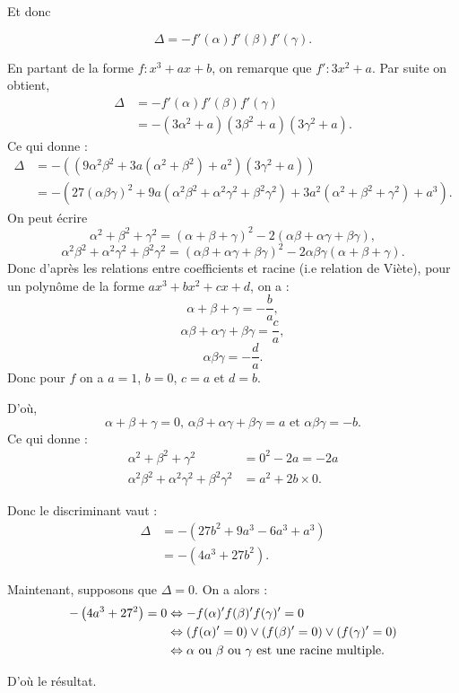 \begin{demonstration}
Et donc 

\[
\Delta = - f'(\alpha) f'(\beta ) f'(\gamma)
.\] 

En partant de la forme $f : x^3 + ax + b$, on remarque que $f' : 3x^2 + a$. Par suite on obtient,
\begin{align*}
    \Delta &= - f'(\alpha) f'(\beta ) f'(\gamma) \\
      &= - \left( 3 \alpha^2 + a \right) \left( 3 \beta^2 + a \right) \left( 3 \gamma^2 + a \right) 
.\end{align*}
Ce qui donne :
\begin{align*}
    \Delta  &= - \left( ( 9 \alpha^2 \beta^2 + 3a ( \alpha^2 + \beta^2 ) + a^2 ) ( 3 \gamma^2 + a ) \right)  \\
       &= - \left( 27 \left( \alpha \beta \gamma \right)^2  + 9a \left( \alpha^2 \beta^2 + \alpha^2 \gamma^2 + \beta^2 \gamma^2 \right) + 3a^2 \left( \alpha^2 + \beta^2 + \gamma^2 \right) + a^3 \right) 
.\end{align*}
On peut écrire
\[
\alpha^2 + \beta^2 + \gamma^2 = \left( \alpha + \beta + \gamma \right)^2 - 2 \left( \alpha \beta + \alpha \gamma + \beta \gamma \right)
,\] 
\[
\alpha^2 \beta^2 + \alpha^2 \gamma^2 + \beta^2 \gamma^2 = \left( \alpha \beta + \alpha \gamma + \beta \gamma \right)^2 - 2\alpha \beta \gamma \left( \alpha + \beta + \gamma \right)
.\] 
Donc d'après les relations entre coefficients et racine (i.e relation de Viète), pour un polynôme de la forme $ax^3 + bx^2 + cx + d$, on a :
\[
\alpha + \beta + \gamma = - \frac{b}{a}
,\] 
\[
\alpha \beta + \alpha \gamma + \beta \gamma = \frac{c}{a}
,\] 
\[
\alpha \beta \gamma = - \frac{d}{a}
.\] 
Donc pour $f$ on a $a = 1$, $b = 0$, $c = a$ et $d = b$.

D'où,
\[
\alpha + \beta + \gamma = 0 \text{, } \alpha \beta + \alpha \gamma + \beta \gamma = a \text{ et } \alpha \beta \gamma = - b
.\] 
Ce qui donne : 
\begin{align*}
    \alpha^2 + \beta^2 + \gamma^2 &= 0^2 - 2a = -2a \\
    \alpha^2 \beta^2 + \alpha^2 \gamma^2 + \beta^2 \gamma^2 &= a^2 + 2b \times 0
.\end{align*}

Donc le discriminant vaut :
\begin{align*}
    \Delta &= - \left( 27b^2 + 9a^3 - 6a^3 + a^3  \right) \\
        &= - \left( 4a^3 + 27b^2  \right)
.\end{align*}

Maintenant, supposons que $\Delta = 0$. On a alors :
 \begin{align*}
     - \left( 4a^3 + 27^2 \right) = 0 &\Leftrightarrow - f(\alpha)' f(\beta )' f(\gamma)' = 0 \\
                                      & \Leftrightarrow \left( f(\alpha)' = 0 \right) \vee \left( f(\beta )' = 0 \right) \vee \left( f(\gamma)' = 0 \right) \\
                                      &\Leftrightarrow \alpha \text{ ou } \beta \text{ ou } \gamma \text{ est une racine multiple}
.\end{align*}

D'où le résultat.
\end{demonstration}

